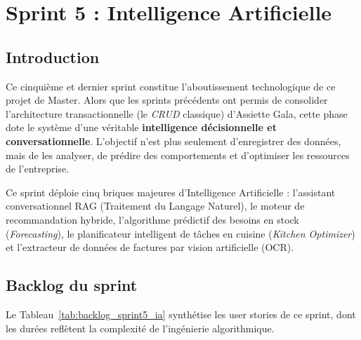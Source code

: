 ﻿%
\chapter{Sprint 5 : Intelligence Artificielle}

\section{Introduction}

Ce cinquième et dernier sprint constitue l'aboutissement technologique de ce projet de Master. Alors que les sprints précédents ont permis de consolider l'architecture transactionnelle (le \textit{CRUD} classique) d'Assiette Gala, cette phase dote le système d'une véritable \textbf{intelligence décisionnelle et conversationnelle}. L'objectif n'est plus seulement d'enregistrer des données, mais de les analyser, de prédire des comportements et d'optimiser les ressources de l'entreprise.

Ce sprint déploie cinq briques majeures d'Intelligence Artificielle : l'assistant conversationnel RAG (Traitement du Langage Naturel), le moteur de recommandation hybride, l'algorithme prédictif des besoins en stock (\textit{Forecasting}), le planificateur intelligent de tâches en cuisine (\textit{Kitchen Optimizer}) et l'extracteur de données de factures par vision artificielle (OCR).

\section{Backlog du sprint}

Le Tableau~\ref{tab:backlog_sprint5_ia} synthétise les user stories de ce sprint, dont les durées reflètent la complexité de l'ingénierie algorithmique.

